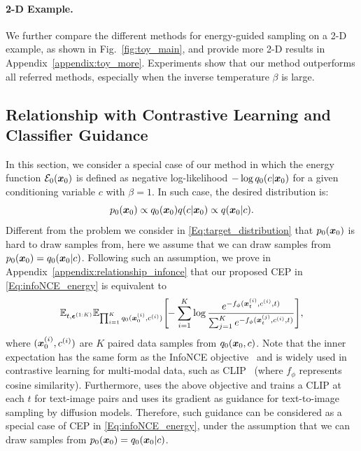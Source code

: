 \paragraph{2-D Example.}
We further compare the different methods for energy-guided sampling on a 2-D example, as shown in Fig.~\ref{fig:toy_main}, and provide more 2-D results in Appendix~\ref{appendix:toy_more}. Experiments show that our method outperforms all referred methods, especially when the inverse temperature $\beta$ is large. 



\subsection{Relationship with Contrastive Learning and Classifier Guidance}
\label{sec:compare_classifier_guidance}
In this section, we consider a special case of our method in which the energy function ${\mathcal{E}}_0({\bm{x}}_0)$ is defined as negative log-likelihood $-\log q_0(c|{\bm{x}}_0)$ for a given conditioning variable $c$ with $\beta=1$. In such case, the desired distribution is:
\begin{equation*}
    p_0({\bm{x}}_0) \propto q_0({\bm{x}}_0)q(c|{\bm{x}}_0) \propto q({\bm{x}}_0|c).
\end{equation*}
Different from the problem we consider in \eqref{Eq:target_distribution} that $p_0({\bm{x}}_0)$ is hard to draw samples from, here we assume that we can draw samples from $p_0({\bm{x}}_0)=q_0({\bm{x}}_0|c)$. Following such an assumption, we prove in Appendix~\ref{appendix:relationship_infonce} that our proposed CEP in \eqref{Eq:infoNCE_energy} is equivalent to
\begin{equation}
\label{Eq:contarstive_condition_loss}
\begin{split}
    \mathbb{E}_{t,\bm{\epsilon}^{(1:K)}}\mathbb{E}_{\prod_{i=1}^K q_0({\bm{x}}_0^{(i)},c^{(i)})}\Bigg[\!\!
    -\sum_{i=1}^K \log \frac{e^{-f_\phi({\bm{x}}_t^{(i)},c^{(i)},t)}}{\sum_{j=1}^K e^{-f_\phi({\bm{x}}_t^{(j)},c^{(i)},t)}}
\Bigg],
\end{split}
\end{equation}
where $({\bm{x}}_0^{(i)}, c^{(i)})$ are $K$ paired data samples from $q_0({\bm{x}}_0,c)$.
Note that the inner expectation has the same form as the InfoNCE objective~\citep{infoNCE} and is widely used in contrastive learning for multi-modal data, such as CLIP~\citep{radford2021learning} (where $f_\phi$ represents cosine similarity).
Furthermore, \citet{nichol2021glide} uses the above objective and trains a CLIP at each $t$ for text-image pairs and uses its gradient as guidance for text-to-image sampling by diffusion models.
Therefore, such guidance can be considered as a special case of CEP in \eqref{Eq:infoNCE_energy}, under the assumption that we can draw samples from $p_0({\bm{x}}_0)=q_0({\bm{x}}_0|c)$.

